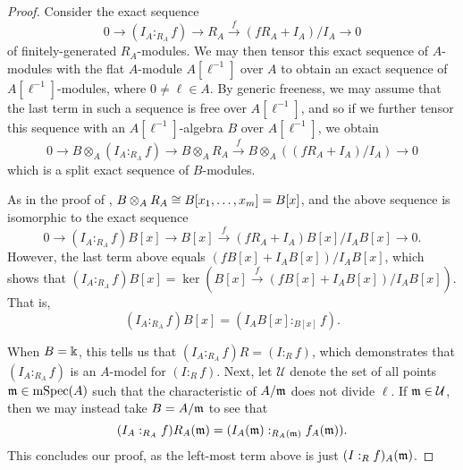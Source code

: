 \documentclass[11pt]{amsart}
\newcommand{\mspec}{\operatorname{mSpec}}
\begin{document}
 \begin{proof}
    Consider the exact sequence
    \[
       0 \to (I_A :_{R_A} f) \to R_A \stackrel{f}{\longrightarrow} (f R_A + I_A)/I_A \to 0
    \]
    of finitely-generated $R_A$-modules.
    We may then tensor this exact sequence of $A$-modules with the flat $A$-module $A[\ell^{-1}]$ over $A$ to obtain an exact sequence of $A[\ell^{-1}]$-modules, where $0 \neq \ell \in A$.  By generic freeness, we may assume that the last term in such a sequence is free over $A[\ell^{-1}]$, and so if we further tensor this sequence with an $A[\ell^{-1}]$-algebra $B$ over $A[\ell^{-1}]$, we obtain
    \[
       0 \to B \otimes_A (I_A :_{R_A} f) \to B \otimes_A R_A \stackrel{f}{\longrightarrow} B \otimes_A ((f R_A + I_A)/I_A) \to 0
    \]
    which is a split exact sequence of $B$-modules.

    As in the proof of , $B \otimes_A R_A \cong B[x_1, \ldots, x_m]=B[x]$, and the above sequence is isomorphic to the exact sequence
    \[
       0 \to (I_A :_{R_A} f) B[x] \to  B[x] \stackrel{f}{\longrightarrow} (f R_A + I_A)B[x]/I_AB[x] \to 0.
    \]
    However, the last term above equals $(fB[x] + I_AB[x])/I_AB[x]$, which shows that $(I_A:_{R_A} f)B[x]= \ker ( B[x] \stackrel{f}{\longrightarrow} (fB[x] + I_AB[x])/I_AB[x])$.
    That is,
    \[ 
       (I_A:_{R_A} f)B[x] = (I_AB[x] :_{B[x]} f).
    \]

    When $B=\Bbbk$, this tells us that $(I_A:_{R_A} f)R = (I :_{R} f)$, which demonstrates that $(I_A :_{R_A} f)$ is an $A$-model for $(I :_R f)$.
    Next, let $\mathcal{U}$ denote the set of all points $\maxi \in \mspec(A)$ such that the characteristic of $A/\mathfrak{m}$ does not divide $\ell$.
    If $\mathfrak{m} \in \mathcal{U}$, then we may instead take $B=A/\mathfrak{m}$ to see that
    \[
       (I_A:_{R_A} f)R_A(\mathfrak{m}) = (I_A(\mathfrak{m}) :_{R_A(\mathfrak{m})} f_A(\mathfrak{m})).
    \]
    This concludes our proof, as the left-most term above is just $(I :_R f)_A(\mathfrak{m})$.
\end{proof}
\end{document}
